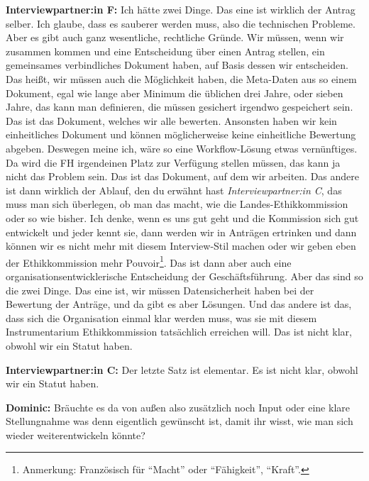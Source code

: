 \documentclass[a4paper,12pt,twoside]{scrreprt}
\begin{document}
\textbf{Interviewpartner:in F:} Ich hätte zwei Dinge. Das eine ist wirklich der Antrag selber. Ich glaube, dass es sauberer werden muss, also die technischen Probleme. Aber es gibt auch ganz wesentliche, rechtliche Gründe. Wir müssen, wenn wir zusammen kommen und eine Entscheidung über einen Antrag stellen, ein gemeinsames verbindliches Dokument haben, auf Basis dessen wir entscheiden. Das heißt, wir müssen auch die Möglichkeit haben, die Meta-Daten aus so einem Dokument, egal wie lange aber Minimum die üblichen drei Jahre, oder sieben Jahre, das kann man definieren, die müssen gesichert irgendwo gespeichert sein. Das ist das Dokument, welches wir alle bewerten. Ansonsten haben wir kein einheitliches Dokument und können möglicherweise keine einheitliche Bewertung abgeben. Deswegen meine ich, wäre so eine Workflow-Lösung etwas vernünftiges. Da wird die FH irgendeinen Platz zur Verfügung stellen müssen, das kann ja nicht das Problem sein. Das ist das Dokument, auf dem wir arbeiten. Das andere ist dann wirklich der Ablauf, den du erwähnt hast \textit{Interviewpartner:in C}, das muss man sich überlegen, ob man das macht, wie die Landes-Ethikkommission oder so wie bisher. Ich denke, wenn es uns gut geht und die Kommission sich gut entwickelt und jeder kennt sie, dann werden wir in Anträgen ertrinken und dann können wir es nicht mehr mit diesem Interview-Stil machen oder wir geben eben der Ethikkommission mehr Pouvoir\footnote{Anmerkung: Französisch für \enquote{Macht} oder \enquote{Fähigkeit}, \enquote{Kraft}.}. Das ist dann aber auch eine organisationsentwicklerische Entscheidung der Geschäftsführung. Aber das sind so die zwei Dinge. Das eine ist, wir müssen Datensicherheit haben bei der Bewertung der Anträge, und da gibt es aber Lösungen. Und das andere ist das, dass sich die Organisation einmal klar werden muss, was sie mit diesem Instrumentarium Ethikkommission tatsächlich erreichen will. Das ist nicht klar, obwohl wir ein Statut haben.

\textbf{Interviewpartner:in C:} Der letzte Satz ist elementar. Es ist nicht klar, obwohl wir ein Statut haben.

\textbf{Dominic:} Bräuchte es da von außen also zusätzlich noch Input oder eine klare Stellungnahme was denn eigentlich gewünscht ist, damit ihr wisst, wie man sich wieder weiterentwickeln könnte?
\end{document}
